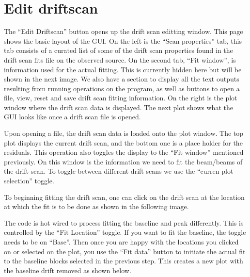\documentclass[letterpaper,10pt,english]{sphinxmanual}
\begin{document}
\noindent{}


\section{Edit driftscan}
\label{\detokenize{extras/gui:edit-driftscan}}
\sphinxAtStartPar
The “Edit Driftscan” button opens up the drift scan editting window.
This page shows the basic layout of the GUI. On the left is the “Scan properties”
tab, this tab consists of a curated list of some of the drift scan properties found in
the drift scan fits file on the observed source. On the second tab, “Fit window”, is
information used for the actual fitting. This is currently hidden here but will be
shown in the next image. We also have a section to display all the text
outputs resulting from running operations on the program, as well as buttons to
open a file, view, reset and save drift scan fitting information. On the right is the
plot window where the drift scan data is displayed. The next plot shows what the GUI
looks like once a drift scan file is opened.

\noindent{}

\sphinxAtStartPar
Upon opening a file, the drift scan data is loaded onto the plot window. The top plot
displays the current drift scan, and the bottom one is a place holder for the residuals.
This operation also toggles the display to the “Fit window” mentioned previously. On this
window is the information we need to fit the beam/beams of the drift scan. To toggle between
different drift scans we use the “curren plot selection” toggle.

\noindent{}

\sphinxAtStartPar
To beginning fitting the drift scan, one can click on the drift scan at the location at
which the fit is to be done as shown in the following image.

\noindent{}

\sphinxAtStartPar
The code is hot wired to process fitting the baseline and peak differently. This is
controlled by the “Fit Location” toggle. If you want to fit the baseline, the toggle
needs to be on “Base”. Then once you are happy with the locations you clicked on or
selected on the plot, you use the “Fit data” button to initiate the actual
fit to the baseline blocks selected in the previous step.  This creates a new plot
with the baseline drift removed as shown below.
\end{document}
